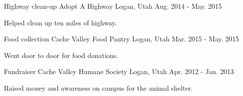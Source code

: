 


\begin{cventries}



\cventry
{Highway clean-up} %
{Adopt A Highway} %
{Logan, Utah} %
{Aug. 2014 - May. 2015} %
{ %
\begin{cvitems}
\item {Helped clean up ten miles of highway.}
\end{cvitems}
}


\cventry
{Food collection} %
{Cache Valley Food Pantry} %
{Logan, Utah} %
{Mar. 2015 - May. 2015} %
{ %
\begin{cvitems}
\item {Went door to door for food donations.}
\end{cvitems} 
}


\cventry
{Fundraiser} %
{Cache Valley Humane Society} %
{Logan, Utah} %
{Apr. 2012 - Jan. 2013} %
{ %
\begin{cvitems}
\item {Raised money and awareness on campus for the animal shelter.}
\end{cvitems} 
}

\end{cventries}